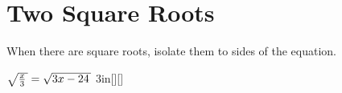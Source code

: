 \section{Two Square Roots}

\begin{tcolorbox}[center,width=4.5in,colback=white]
    When there are  square roots,
    isolate them to  sides of the equation.
\end{tcolorbox}



{
    $\myRoot{\frac{x}{3}} = \myRoot{3x-24}$
}{3in}[\raggedleft{}][\raggedleft{}]

